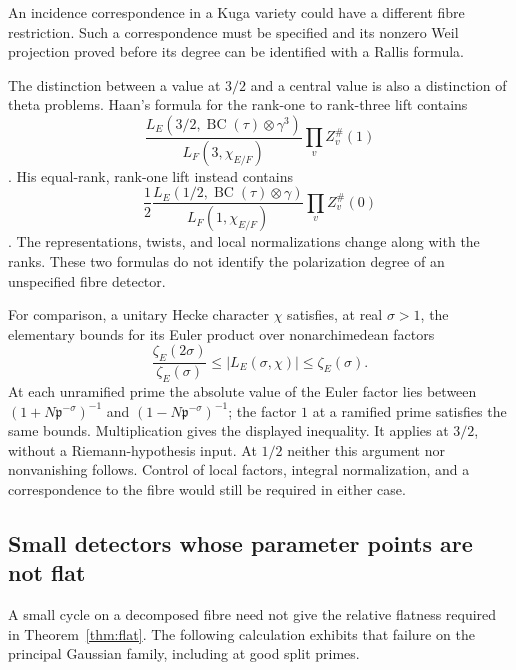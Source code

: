 \documentclass[11pt]{article}
\theoremstyle{definition}
\theoremstyle{remark}
\begin{document}
An incidence correspondence in a Kuga variety could have a
different fibre restriction.  Such a correspondence must be
specified and its nonzero Weil projection proved before its
degree can be identified with a Rallis formula.

The distinction between a value at $3/2$ and a central value is
also a distinction of theta problems.  Haan's formula for the
rank-one to rank-three lift contains
\[
 \frac{L_E(3/2,\operatorname{BC}(\tau)\otimes\gamma^3)}
      {L_F(3,\chi_{E/F})}
 \prod_v Z_v^{\#}(1)
\]
\cite[Theorem~3.4, p.~8]{Haan}.  His equal-rank, rank-one lift
instead contains
\[
 \frac12\frac{L_E(1/2,\operatorname{BC}(\tau)\otimes\gamma)}
                {L_F(1,\chi_{E/F})}
 \prod_v Z_v^{\#}(0)
\]
\cite[Theorem~3.5, p.~9]{Haan}.  The representations, twists,
and local normalizations change along with the ranks.  These
two formulas do not identify the polarization degree of an
unspecified fibre detector.

For comparison, a unitary Hecke character $\chi$ satisfies, at
real $\sigma>1$, the elementary bounds for its Euler product over nonarchimedean factors
\[
 \frac{\zeta_E(2\sigma)}{\zeta_E(\sigma)}
 \leq |L_E(\sigma,\chi)|\leq\zeta_E(\sigma).
\]
At each unramified prime the absolute value of the Euler factor
lies between $(1+N\mathfrak p^{-\sigma})^{-1}$ and
$(1-N\mathfrak p^{-\sigma})^{-1}$; the factor $1$ at a
ramified prime satisfies the same bounds.  Multiplication gives
the displayed inequality.  It applies at $3/2$, without a
Riemann-hypothesis input.  At $1/2$ neither this argument nor
nonvanishing follows.  Control of local factors, integral
normalization, and a correspondence to the fibre would still
be required in either case.

\subsection{Small detectors whose parameter points are not flat}
\label{subsec:doubling-nonflat}

A small cycle on a decomposed fibre need not give the relative
flatness required in Theorem~\ref{thm:flat}.  The following
calculation exhibits that failure on the principal Gaussian
family, including at good split primes.
\end{document}
